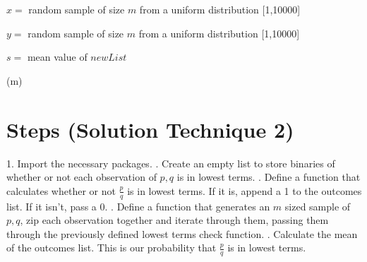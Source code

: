 \documentclass{article}
\begin{document}
\begin{algorithm}


     $x =$ random sample of size $m$ from a uniform distribution [1,10000]
     
     
    $y =$ random sample of size $m$ from a uniform distribution [1,10000]


        
    $s =$ mean value of $newList$
    
    
    \caption{\lowestTermsSim(m)}
\end{algorithm}

\section{Steps (Solution Technique 2)}

1. Import the necessary packages.
\newline
{}. Create an empty list to store binaries of whether or not each observation of $p,q$ is in lowest terms.
\newline
{}. Define a function that calculates whether or not $\frac{p}{q}$ is in lowest terms. If it is, append a 1 to the outcomes list. If it isn't, pass a 0.
\newline
{}. Define a function that generates an $m$ sized sample of $p,q$, zip each observation together and iterate through them, passing them through the previously defined lowest terms check function.
\newline
{}. Calculate the mean of the outcomes list. This is our probability that $\frac{p}{q}$ is in lowest terms.


\pagebreak 
\end{document}
